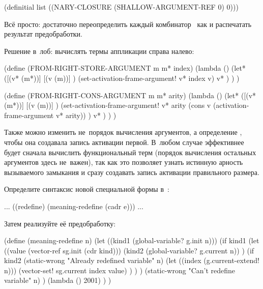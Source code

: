 \begin{code:lisp}
(definitial list ((NARY-CLOSURE (SHALLOW-ARGUMENT-REF 0) 0)))
\end{code:lisp}



Всё просто: достаточно переопределить каждый комбинатор~ как  и распечатать результат предобработки.



Решение в~лоб: вычислять термы аппликации справа налево:

\begin{code:lisp}
(define (FROM-RIGHT-STORE-ARGUMENT m m* index)
  (lambda ()
    (let* ([(v* (m*))]
           [(v  (m))] )
      (set-activation-frame-argument! v* index v)
      v* ) ) )

(define (FROM-RIGHT-CONS-ARGUMENT m m* arity)
  (lambda ()
    (let* ([(v* (m*))]
           [(v  (m))] )
      (set-activation-frame-argument!
       v* arity (cons v (activation-frame-argument v* arity)) )
      v* ) ) )
\end{code:lisp}

Также можно изменить не~порядок вычисления аргументов, а определение
, чтобы она создавала запись активации первой. В~любом случае
эффективнее будет сначала вычислить функциональный терм (порядок вычисления
остальных аргументов здесь не~важен), так как это позволяет узнать истинную
арность вызываемого замыкания и сразу создавать запись активации правильного
размера.



Определите синтаксис новой специальной формы в~:

\begin{code:lisp}
... ((redefine) (meaning-redefine (cadr e))) ...
\end{code:lisp}

\noindent
Затем реализуйте её предобработку:

\begin{code:lisp}
(define (meaning-redefine n)
  (let ((kind1 (global-variable? g.init n)))
    (if kind1
        (let ((value (vector-ref sg.init (cdr kind)))
              (kind2 (global-variable? g.current n)) )
          (if kind2
              (static-wrong "Already redefined variable" n)
              (let ((index (g.current-extend! n)))
                (vector-set! sg.current index value) ) ) )
        (static-wrong "Can't redefine variable" n) )
    (lambda () 2001) ) )
\end{code:lisp}


